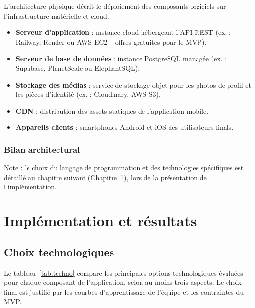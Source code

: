 \documentclass[12pt, a4paper]{report}
\begin{document}
L'architecture physique décrit le déploiement des composants logiciels sur
l'infrastructure matérielle et cloud.

\begin{itemize}
  \item \textbf{Serveur d'application} : instance cloud hébergeant l'\ac{API} \ac{REST}
        (ex. : Railway, Render ou AWS EC2 -- offres gratuites pour le \ac{MVP}).
  \item \textbf{Serveur de base de données} : instance PostgreSQL managée (ex. : Supabase,
        PlanetScale ou ElephantSQL).
  \item \textbf{Stockage des médias} : service de stockage objet pour les photos de profil
        et les pièces d'identité (ex. : Cloudinary, AWS S3).
  \item \textbf{CDN} : distribution des assets statiques de l'application mobile.
  \item \textbf{Appareils clients} : smartphones Android et iOS des utilisateurs finals.
\end{itemize}

\subsection{Bilan architectural}

Note : le choix du langage de programmation et des technologies spécifiques est détaillé
au chapitre suivant (Chapitre~\ref{chap:impl}), lors de la présentation de
l'implémentation.

\chapter{Implémentation et résultats}
\label{chap:impl}

\section{Choix technologiques}

Le tableau~\ref{tab:techno} compare les principales options technologiques évaluées
pour chaque composant de l'application, selon au moins trois aspects. Le choix final
est justifié par les courbes d'apprentissage de l'équipe et les contraintes du \ac{MVP}.
\end{document}
